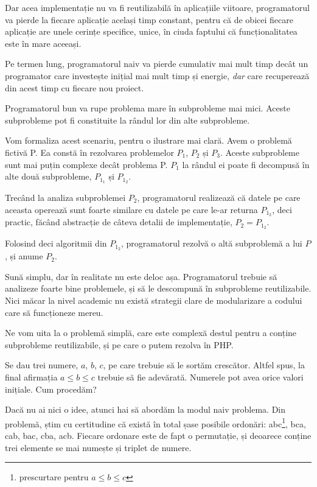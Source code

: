 Dar acea implementație nu va fi reutilizabilă în aplicațiile
viitoare, programatorul va pierde la fiecare aplicație
același timp constant, pentru că de obicei fiecare aplicație
are unele cerințe specifice, unice, în ciuda faptului că
funcționalitatea este în mare aceeași.

Pe termen lung, programatorul naiv va pierde cumulativ mai mult timp
decât un programator care investește inițial mai mult timp și
energie, \textit{dar} care recuperează din acest timp
cu fiecare nou proiect.

Programatorul bun va rupe problema mare în subprobleme mai mici.
Aceste subprobleme pot fi constituite la rândul lor din alte subprobleme.

Vom formaliza acest scenariu, pentru o ilustrare mai clară. Avem o problemă fictivă P.
Ea constă în rezolvarea problemelor $P_1$, $P_2$ și $P_3$. Aceste subprobleme
sunt mai puțin complexe decât problema P. $P_1$ la rândul ei poate fi decompusă în alte
două subprobleme, $P_{1_1}$ și $P_{1_2}$.

Trecând la analiza subproblemei $P_2$, programatorul realizează că datele pe care
aceasta operează sunt foarte similare cu datele pe care le-ar returna $P_{1_2}$, deci
practic, făcând abstracție de câteva detalii de implementație, $P_2 = P_{1_2}$.

Folosind deci algoritmii din $P_{1_2}$, programatorul rezolvă o altă subproblemă a lui $P$,
și anume $P_2$.


Sună simplu, dar în realitate nu este deloc așa. Programatorul trebuie să analizeze foarte
bine problemele, și să le descompună în subprobleme reutilizabile. Nici măcar la
nivel academic nu există strategii clare de modularizare a codului care să funcționeze mereu.

Ne vom uita la o problemă simplă, care este complexă destul pentru a conține subprobleme reutilizabile,
și pe care o putem rezolva în PHP.

Se dau trei numere, $a$, $b$, $c$, pe care trebuie să le sortăm crescător. Altfel spus, la final
afirmația $a \leq b \leq c$ trebuie să fie adevărată. Numerele pot avea orice valori inițiale.
Cum procedăm?

Dacă nu ai nici o idee, atunci hai să abordăm la modul naiv problema. Din problemă, știm
cu certitudine că
există în total șase posibile ordonări: abc\footnote{prescurtare pentru  $a \leq b \leq c$},
bca, cab, bac, cba, acb. Fiecare ordonare este de fapt o permutație, și deoarece conține trei
elemente se mai numește și triplet de numere.

